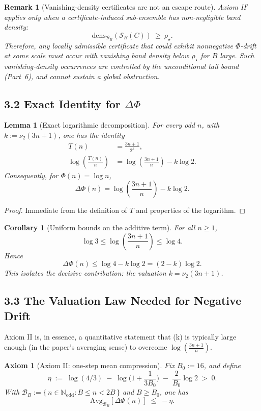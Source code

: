\documentclass[preprint,12pt]{elsarticle}
\newtheorem{remark}{Remark}
\newtheorem{lemma}{Lemma}
\newtheorem{corollary}{Corollary}
\newtheorem{axiom}{Axiom}
\newcommand{\BandAvg}[2]{\mathrm{Avg}_{#1}\!\left[#2\right]}  %
\newcommand{\densB}[2]{\mathrm{dens}_{#1}\!\left(#2\right)}
\begin{document}
\begin{remark}[Vanishing-density certificates are not an escape route]
\label{rem:vanishing_density_role}
Axiom II$'$ applies only when a certificate-induced sub-ensemble has non-negligible band density:
\[
\densB{\mathcal{B}_B}{\mathcal{S}_B(C)}\ \ge\ \rho_\star.
\]
Therefore, any locally admissible certificate that could exhibit nonnegative $\Phi$-drift at some scale
must occur with vanishing band density below $\rho_\star$ for $B$ large.
Such vanishing-density occurrences are controlled by the unconditional tail bound (Part~6),
and cannot sustain a global obstruction.
\end{remark}

\subsection{3.2 Exact Identity for \texorpdfstring{\(\Delta\Phi\)}{Delta Phi}}
\begin{lemma}[Exact logarithmic decomposition]
For every odd \(n\), with \(k:=\nu_2(3n+1)\), one has the identity
\[
\begin{aligned}
T(n)&=\frac{3n+1}{2^k},\\
\log\!\left(\frac{T(n)}{n}\right)
&= \log\!\left(\frac{3n+1}{n}\right) - k\log 2.
\end{aligned}
\]
Consequently, for \(\Phi(n)=\log n\),
\[
\Delta\Phi(n)
= \log\!\left(\frac{3n+1}{n}\right) - k\log 2.
\]
\end{lemma}
\begin{proof}
Immediate from the definition of \(T\) and properties of the logarithm.
\end{proof}

\begin{corollary}[Uniform bounds on the additive term]
For all \(n\ge 1\),
\[
\log 3 \le \log\!\left(\frac{3n+1}{n}\right) \le \log 4.
\]
Hence
\[
\Delta\Phi(n) \le \log 4 - k\log 2 = (2-k)\log 2.
\]
This isolates the decisive contribution: the valuation \(k=\nu_2(3n+1)\).
\end{corollary}

\subsection{3.3 The Valuation Law Needed for Negative Drift}
Axiom II is, in essence, a quantitative statement that (k) is typically large enough (in the paper’s averaging sense) to overcome \(\log\!\left(\frac{3n+1}{n}\right)\).
\begin{axiom}[Axiom II: one-step mean compression]
Fix \(B_0 := 16\), and define
\[
\eta \;:=\; \log(4/3)\;-\;\log\!\Big(1+\frac{1}{3B_0}\Big)\;-\;\frac{2}{B_0}\log 2 \;>\;0.
\]
With \(\mathcal{B}_B := \{\,n\in\mathbb{N}_{\mathrm{odd}} : B \le n < 2B\,\}\) and \(B\ge B_0\), one has
\[
\BandAvg{\mathcal{B}_B}{\Delta\Phi(n)}\;\le\;-\eta.
\]
\end{axiom}
\end{document}

